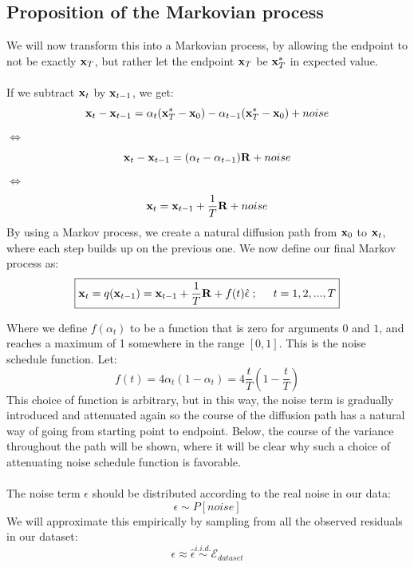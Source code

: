 \documentclass[twocolumn]{article}
\begin{document}
\begin{appendices}
\subsection{Proposition of the Markovian process}
We will now transform this into a Markovian process, by allowing the endpoint to not be exactly $\bold{x}_T$, but rather let the endpoint $\bold{x}_T$ be $\bold{x}_T^*$ in expected value.\\
\\
If we subtract $\bold{x}_t$ by $\bold{x}_{t-1}$, we get:
\begin{equation}
    \bold{x}_t - \bold{x}_{t-1} = \alpha_t (\bold{x}_T^* - \bold{x}_0) - \alpha_{t-1} (\bold{x}_T^* - \bold{x}_0) + noise
\end{equation}
$\Leftrightarrow$
\begin{equation}
    \bold{x}_t - \bold{x}_{t-1} = (\alpha_t - \alpha_{t-1}) \bold{R} + noise
\end{equation}
$\Leftrightarrow$
\begin{equation}
    \bold{x}_t = \bold{x}_{t-1} + \frac{1}{T} \bold{R} + noise
\end{equation}
By using a Markov process, we create a natural diffusion path from $\bold{x}_0$ to $\bold{x}_t$, where each step builds up on the previous one. 
We now define our final Markov process as: 
\begin{equation} \label{eq:f(t)}
    \boxed{\bold{x}_t = q(\bold{x}_{t-1}) = \bold{x}_{t-1} + \frac{1}{T} \bold{R} + f(t) \hat{\epsilon} \hspace{.1cm};\hspace{.5cm} t=1,2,...,T}
\end{equation}

Where we define $f(\alpha_t)$ to be a function that is zero for arguments $0$ and $1$, and reaches a maximum of 1 somewhere in the range $[0,1]$. This is the noise schedule function. Let:
\begin{equation}
    f(t) = 4\alpha_t(1-\alpha_t) = 4 \frac{t}{T} (1-\frac{t}{T})
\end{equation}
This choice of function is arbitrary, but in this way, the noise term is gradually introduced and attenuated again so the course of the diffusion path has a natural way of going from starting point to endpoint. Below, the course of the variance throughout the path will be shown, where it will be clear why such a choice of attenuating noise schedule function is favorable. \\
\\
The noise term $\epsilon$ should be distributed according to the real noise in our data:
\begin{equation}
    \epsilon \sim P[noise]
\end{equation}
We will approximate this empirically by sampling from all the observed residuals in our dataset:
\begin{equation}
    \epsilon \approx \hat{\epsilon} \stackrel{i.i.d.}{\sim} \mathcal{E}_{dataset}
\end{equation}


\end{appendices}
\end{document}
